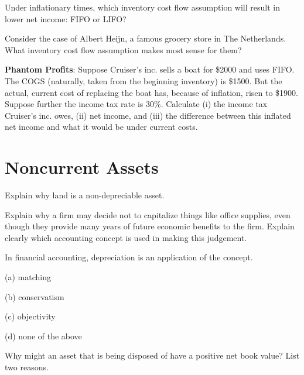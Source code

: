 \documentclass{scrartcl}
\begin{document}
Under inflationary times, which inventory cost flow assumption will 
result in lower net income: FIFO or LIFO? 

\vspace{10em}

Consider the case of Albert Heijn, a famous grocery store in The 
Netherlands. What inventory cost flow assumption makes most sense for
them? 

\vspace{10em}

\textbf{Phantom Profits}: Suppose Cruiser's inc. sells a boat for 
\$2000 and uses FIFO. The COGS (naturally, taken from the beginning
inventory) is \$1500. But the actual, current cost of replacing the 
boat has, because of inflation, risen to \$1900. Suppose further the
income tax rate is 30\%. Calculate (i) the income tax Cruiser's inc. owes,
(ii) net income, and (iii) the difference between this inflated net
income and what it would be under current costs. 

\vspace{10em}

\section{Noncurrent Assets}

Explain why land is a non-depreciable asset.

\vspace{10em}

Explain why a firm may decide not to capitalize things like office 
supplies, even though they provide many years of future economic
benefits to the firm. Explain clearly which accounting concept is
used in making this judgement. 

\vspace{10em}

In financial accounting, depreciation is an application of the 
\underline{\phantom{matching}} concept.

(a) matching

(b) conservatism

(c) objectivity

(d) none of the above

\vspace{10em}

Why might an asset that is being disposed of have a positive net book
value? List two reasons. 

\vspace{10em}
\end{document}
